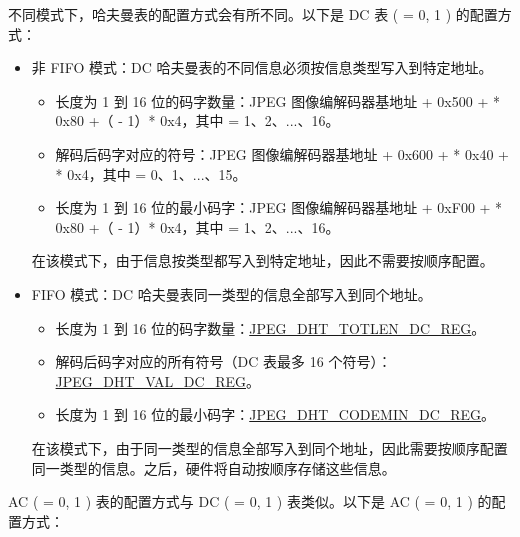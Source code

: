 \documentclass[main\_\_CN.tex]{subfiles}
\begin{document}
不同模式下，哈夫曼表的配置方式会有所不同。以下是 DC 表 ( = 0, 1 ) 的配置方式：
\begin{itemize}
    \item 非 FIFO 模式：DC 哈夫曼表的不同信息必须按信息类型写入到特定地址。
    \begin{itemize}
        \item 长度为 1 到 16 位的码字数量：JPEG 图像编解码器基地址 + 0x500 +  * 0x80 +（ - 1）* 0x4，其中  = 1、2、...、16。
        \item 解码后码字对应的符号：JPEG 图像编解码器基地址 + 0x600 +  * 0x40 +  * 0x4，其中  = 0、1、...、15。
        \item 长度为 1 到 16 位的最小码字：JPEG 图像编解码器基地址 + 0xF00 +  * 0x80 +（ - 1）* 0x4，其中  = 1、2、...、16。
    \end{itemize}
    在该模式下，由于信息按类型都写入到特定地址，因此不需要按顺序配置。
    \item FIFO 模式：DC 哈夫曼表同一类型的信息全部写入到同个地址。
    \begin{itemize}
        \item 长度为 1 到 16 位的码字数量：\hyperref[regdesc:JPEGDHTTOTLENDC0REG]{JPEG\_DHT\_TOTLEN\_DC\_REG}。
        \item 解码后码字对应的所有符号（DC 表最多 16 个符号）：\hyperref[regdesc:JPEGDHTVALDC0REG]{JPEG\_DHT\_VAL\_DC\_REG}。
        \item 长度为 1 到 16 位的最小码字：\hyperref[regdesc:JPEGDHTCODEMINDC0REG]{JPEG\_DHT\_CODEMIN\_DC\_REG}。
    \end{itemize}
    在该模式下，由于同一类型的信息全部写入到同个地址，因此需要按顺序配置同一类型的信息。之后，硬件将自动按顺序存储这些信息。
\end{itemize}

AC ( = 0, 1 ) 表的配置方式与 DC ( = 0, 1 ) 表类似。以下是 AC ( = 0, 1 ) 的配置方式：
\end{document}
